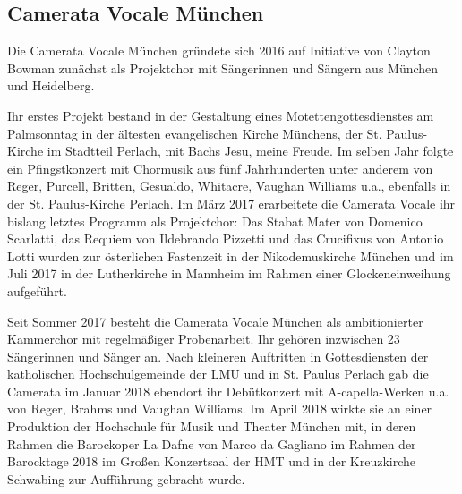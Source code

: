\documentclass[11pt, ngermanm, titlepage]{article}
\begin{document}
\begin{multicols}{2}
	
	\section*{Camerata Vocale München}
	Die Camerata Vocale München gründete sich 2016 auf Initiative von Clayton Bowman zunächst als Projektchor mit Sängerinnen und Sängern aus München und Heidelberg.
	
	Ihr erstes Projekt bestand in der Gestaltung eines Motettengottesdienstes am Palmsonntag in der ältesten evangelischen Kirche Münchens, der St. Paulus-Kirche im Stadtteil Perlach, mit Bachs Jesu, meine Freude. Im selben Jahr folgte ein Pfingstkonzert mit Chormusik aus fünf Jahrhunderten unter anderem von Reger, Purcell, Britten, Gesualdo, Whitacre, Vaughan Williams u.a., ebenfalls in der St. Paulus-Kirche Perlach. Im März 2017 erarbeitete die Camerata Vocale ihr bislang letztes Programm als Projektchor: Das Stabat Mater von Domenico Scarlatti, das Requiem von Ildebrando Pizzetti und das Crucifixus von Antonio Lotti wurden zur österlichen Fastenzeit in der Nikodemuskirche München und im Juli 2017 in der Lutherkirche in Mannheim im Rahmen einer Glockeneinweihung aufgeführt.
	
	Seit Sommer 2017 besteht die Camerata Vocale München als ambitionierter Kammerchor mit regelmäßiger Probenarbeit. Ihr gehören inzwischen 23 Sängerinnen und Sänger an. Nach kleineren Auftritten in Gottesdiensten der katholischen Hochschulgemeinde der LMU und in St. Paulus Perlach gab die Camerata im Januar 2018 ebendort ihr Debütkonzert mit A-capella-Werken u.a. von Reger, Brahms und Vaughan Williams. Im April 2018 wirkte sie an einer Produktion der Hochschule für Musik und Theater München mit, in deren Rahmen die Barockoper La Dafne von Marco da Gagliano im Rahmen der Barocktage 2018 im Großen Konzertsaal der HMT und in der Kreuzkirche Schwabing zur Aufführung gebracht wurde.
		

\end{multicols}
\end{document}
